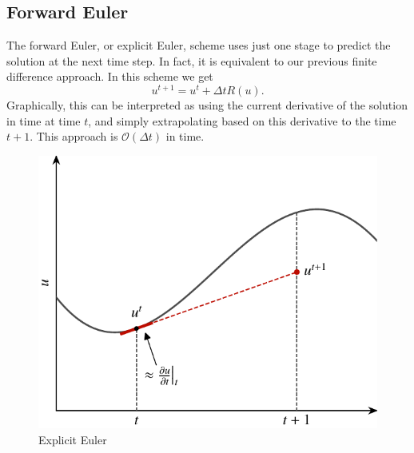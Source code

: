 \subsection{Forward Euler}
The forward Euler, or explicit Euler, scheme uses just one stage to predict the solution at the next time step. In fact, it is equivalent to our previous finite difference approach. In this scheme we get
\begin{equation}
	u^{t+1} = u^t + \Delta t R(u).
\end{equation}
Graphically, this can be interpreted as using the current derivative of the solution in time at time $t$, and simply extrapolating based on this derivative to the time $t+1$. This approach is $\mathcal{O}(\Delta t)$ in time.
\begin{figure}[htbp]
	\centering
	\includegraphics[width=0.6\linewidth]{Pictures/ch15_explicit_euler}
	\caption{Explicit Euler}
	\label{fig:explicit_euler_method}
\end{figure}
